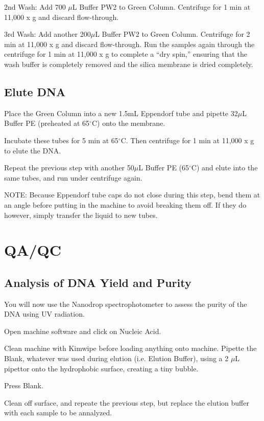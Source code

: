 \documentclass[12pt]{../SOP3_alpha}\usepackage[]{graphicx}\usepackage[]{color}
\begin{document}
\NP 2nd Wash: Add 700 $\mu$L Buffer PW2 to Green Column. Centrifuge for 1 min at 11,000 x g and discard flow-through.

\NP 3rd Wash: Add another 200$\mu$L Buffer PW2 to Green Column. Centrifuge for 2 min at 11,000 x g and discard flow-through. Run the samples again through the centrifuge for 1 min at 11,000 x g to complete a ``dry spin,'' ensuring that the wash buffer is completely removed and the silica membrane is dried completely. 

\subsection*{Elute DNA}

\NP Place the Green Column into a new 1.5mL Eppendorf tube and pipette 32$\mu$L Buffer PE (preheated at 65$^\circ$C) onto the membrane. 

\NP Incubate these tubes for 5 min at 65$^\circ$C. Then centrifuge for 1 min at 11,000 x g to elute the DNA.

\NP Repeat the previous step with another 50$\mu$L Buffer PE (65$^\circ$C) and elute into the same tubes, and run under centrifuge again.

\NP NOTE: Because Eppendorf tube caps do not close during this step, bend them at an angle before putting in the machine to avoid breaking them off. If they do however, simply transfer the liquid to new tubes.


\section{QA/QC}

\subsection*{Analysis of DNA Yield and Purity}

\NP You will now use the Nanodrop spectrophotometer to assess the purity of the DNA using UV radiation. 

\NP Open machine software and click on Nucleic Acid.

\NP Clean machine with Kimwipe before loading anything onto machine. 
\NP Pipette the Blank, whatever was used during elution (i.e. Elution Buffer), using a 2 $\mu$L pipettor onto the hydrophobic surface, creating a tiny bubble.

\NP Press Blank.

\NP Clean off surface, and repeate the previous step, but replace the elution buffer with each sample to be annalyzed.
\end{document}
